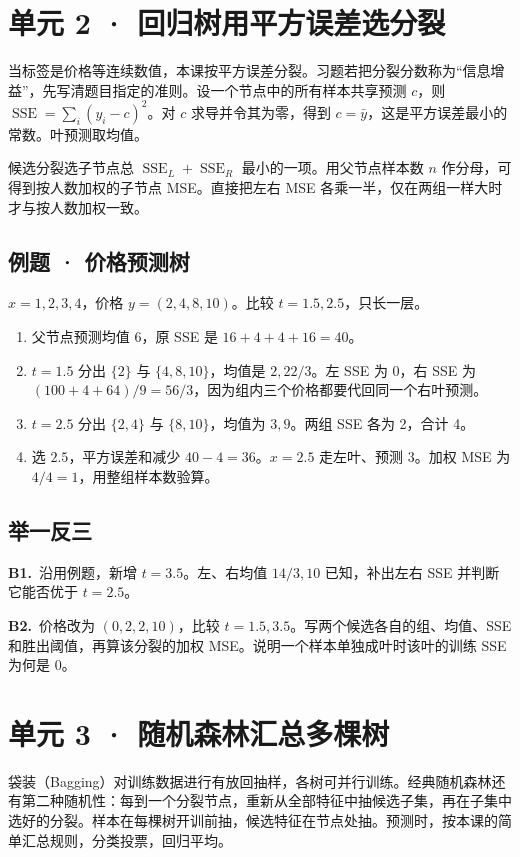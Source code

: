 \documentclass[UTF8,a4paper,11pt]{ctexart}
\newcommand{\PracticeQuestion}[3]{\par\Needspace{4\baselineskip}\noindent\begin{minipage}{\linewidth}\textbf{#1.}\ #2\par\noindent\rule{0pt}{#3mm}\par\end{minipage}\par}
\begin{document}
\section{单元 2 · 回归树用平方误差选分裂}
当标签是价格等连续数值，本课按平方误差分裂。习题若把分裂分数称为“信息增益”，先写清题目指定的准则。设一个节点中的所有样本共享预测 $c$，则 $\operatorname{SSE}=\sum_i(y_i-c)^2$。对 $c$ 求导并令其为零，得到 $c=\bar y$，这是平方误差最小的常数。叶预测取均值。

候选分裂选子节点总 $\operatorname{SSE}_L+\operatorname{SSE}_R$ 最小的一项。用父节点样本数 $n$ 作分母，可得到按人数加权的子节点 MSE。直接把左右 MSE 各乘一半，仅在两组一样大时才与按人数加权一致。

\subsection{例题 · 价格预测树}
$x=1,2,3,4$，价格 $y=(2,4,8,10)$。比较 $t=1.5,2.5$，只长一层。

\begin{enumerate}
\item 父节点预测均值 6，原 SSE 是 $16+4+4+16=40$。
\item $t=1.5$ 分出 $\{2\}$ 与 $\{4,8,10\}$，均值是 $2,22/3$。左 SSE 为 0，右 SSE 为 $(100+4+64)/9=56/3$，因为组内三个价格都要代回同一个右叶预测。
\item $t=2.5$ 分出 $\{2,4\}$ 与 $\{8,10\}$，均值为 $3,9$。两组 SSE 各为 2，合计 4。
\item 选 $2.5$，平方误差和减少 $40-4=36$。$x=2.5$ 走左叶、预测 3。加权 MSE 为 $4/4=1$，用整组样本数验算。
\end{enumerate}
\subsection{举一反三}
\PracticeQuestion{B1}{沿用例题，新增 $t=3.5$。左、右均值 $14/3,10$ 已知，补出左右 SSE 并判断它能否优于 $t=2.5$。}{24}
\PracticeQuestion{B2}{价格改为 $(0,2,2,10)$，比较 $t=1.5,3.5$。写两个候选各自的组、均值、SSE 和胜出阈值，再算该分裂的加权 MSE。说明一个样本单独成叶时该叶的训练 SSE 为何是 0。}{43}
\clearpage
\section{单元 3 · 随机森林汇总多棵树}
袋装（Bagging）对训练数据进行有放回抽样，各树可并行训练。经典随机森林还有第二种随机性：每到一个分裂节点，重新从全部特征中抽候选子集，再在子集中选好的分裂。样本在每棵树开训前抽，候选特征在节点处抽。预测时，按本课的简单汇总规则，分类投票，回归平均。
\end{document}
